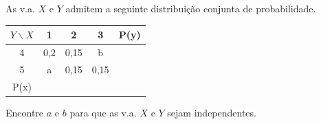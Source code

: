 \documentclass[14pt,aspectratio=1610]{beamer}
\begin{document}
\begin{frame}{}
\frametitle{}
\begin{block}{}
\justifying
As v.a. $X$ e $Y$ admitem a seguinte distribuição conjunta de probabilidade.
\begin{center}
\begin{tabular}{c|ccc|c}
    $Y\backslash  X$ & 1 & 2 & 3 & P(y) \\
  \hline
  4    & 0,2 & 0,15 & b    &   \\
  5    & a   & 0,15 & 0,15 &   \\
  \hline
  P(x) &     &      &      &   \\
   \end{tabular}
\end{center}

Encontre $a$ e $b$ para que as v.a. $X$ e $Y$ sejam independentes.
\end{block}
\end{frame}
\end{document}
